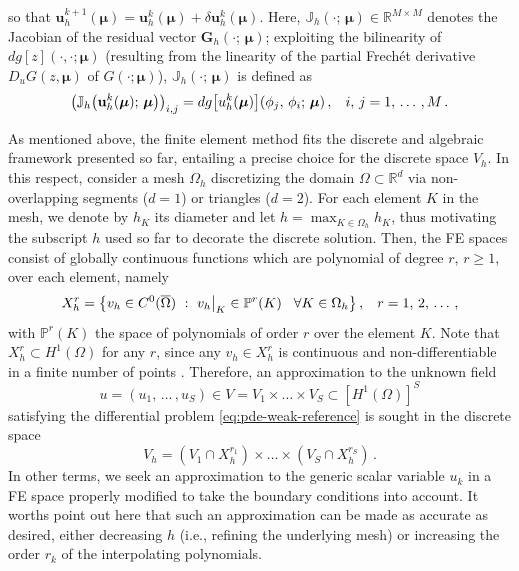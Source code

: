 \documentclass[12pt, a4paper, twoside, openright]{report}
\numberwithin{equation}{chapter}
\theoremstyle{theorem}
\theoremstyle{definition}
\theoremstyle{remark}
\theoremstyle{proposition}
\numberwithin{figure}{chapter}
\newcommand{\bg}[1]{\boldsymbol{#1}}
\begin{document}
		so that $\mathbf{u}^{k+1}_h(\bg{\mu}) = \mathbf{u}^k_h(\bg{\mu}) + \delta \mathbf{u}^k_h(\bg{\mu})$. Here, $\mathbb{J}_h(\cdot; \, \bg{\mu}) \in \mathbb{R}^{M \times M}$ denotes the Jacobian of the residual vector $\mathbf{G}_h(\cdot; \, \bg{\mu})$; exploiting the bilinearity of $dg[z](\cdot, \cdot; \bg{\mu})$ (resulting from the linearity of the partial Frech\'et derivative $D_u G(z, \bg{\mu})$ of $G(\cdot; \bg{\mu})$), $\mathbb{J}_h(\cdot; \, \bg{\mu})$ is defined as
		\begin{equation}
			\left( \mathbb{J}_h \big( \mathbf{u}^k_h(\bg{\mu}); \, \bg{\mu} \big) \right)_{i,j} = dg\big[u^k_h(\bg{\mu})\big](\phi_j, \, \phi_i; \, \bg{\mu}) \, , \hspace*{0.3cm} i, \, j = 1, \, \ldots \, , M \, .
		\end{equation}
		
		As mentioned above, the finite element method fits the discrete and algebraic framework presented so far, entailing a precise choice for the discrete space $V_h$. In this respect, consider a mesh $\Omega_h$ discretizing the domain $\Omega \subset \mathbb{R}^d$ via non-overlapping segments ($d = 1$) or triangles ($d = 2$). For each element $K$ in the mesh, we denote by $h_K$ its diameter and let $h = \max_{K \in \Omega_h} h_K$, thus motivating the subscript $h$ used so far to decorate the discrete solution. Then, the FE spaces consist of globally continuous functions which are polynomial of degree $r$, $r \geq 1$, over each element, namely
		\begin{equation*}
			X_h^r = \big\lbrace v_h \in C^0 ( \overline{\Omega} ) ~ : ~ v_h \big\rvert_K \in \mathbb{P}^r(K) \hspace*{0.3cm} \forall K \in \Omega_h \big\rbrace \, , \hspace*{0.3cm} r = 1, \, 2, \, \ldots \, ,
		\end{equation*}
		with $\mathbb{P}^r(K)$ the space of polynomials of order $r$ over the element $K$. Note that $X_h^r \subset H^1(\Omega)$ for any $r$, since any $v_h \in X_h^r$ is continuous and non-differentiable in a finite number of points \cite{QMN15}. Therefore, an approximation to the unknown field
		\begin{equation}
			\label{eq:notation-1}
			u = \left( u_1, \, \ldots \, , u_S \right) \in V = V_1 \times \ldots \times V_S \subset \left[ H^1(\Omega) \right]^S
		\end{equation}  
		satisfying the differential problem \eqref{eq:pde-weak-reference} is sought in the discrete space
		\begin{equation}
			\label{eq:notation-2}
			V_h = \left( V_1 \cap X_h^{r_1} \right) \times \ldots \times \left( V_S \cap X_h^{r_S} \right) \, .
		\end{equation}
		In other terms, we seek an approximation to the generic scalar variable $u_k$ in a FE space properly modified to take the boundary conditions into account. It worths point out here that such an approximation can be made as accurate as desired, either decreasing $h$ (i.e., refining the underlying mesh) or increasing the order $r_k$ of the interpolating polynomials. 
		
\end{document}

